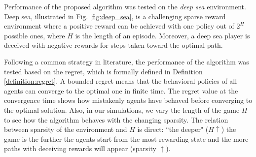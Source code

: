 \documentclass[lettersize,journal]{IEEEtran}
\begin{document}
Performance of  the proposed algorithm was tested on the \textit{deep sea} environment.  Deep sea, illustrated in Fig. \ref{fig:deep_sea},  is a challenging sparse reward environment where a positive reward can be achieved with one policy out of $2^H$ possible ones, where $H$ is the length of an episode. Moreover,  a deep sea player is deceived with  negative rewards for steps taken toward the optimal path. \par 

Following a common strategy in literature, the performance of the algorithm was tested based on the regret, which is formally defined in Definition \ref{definition:regret}. A bounded regret means that the behavioral policies of all agents can converge to the optimal one in finite time. The regret value at the convergence time shows how mistakenly agents have behaved before converging to the optimal solution. Also,  in our simulations, we vary the length of the game $H$ to see how the algorithm behaves with the changing sparsity. The relation between  sparsity of the environment and $H$ is direct: ``the deeper" ($H \uparrow$) the game is the further  the agents start  from the most rewarding state and the more paths with deceiving rewards will appear (sparsity $\uparrow$). 


\end{document}
